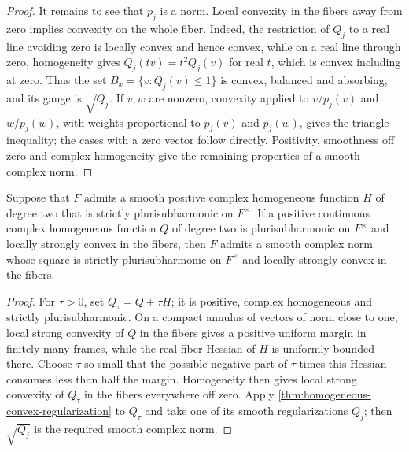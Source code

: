 \begin{proof}
It remains to see that $p_j$ is a norm. Local convexity in the fibers away from zero implies convexity on the whole fiber. Indeed, the restriction of $Q_j$ to a real line avoiding zero is locally convex and hence convex, while on a real line through zero, homogeneity gives $Q_j(tv)=t^2Q_j(v)$ for real $t$, which is convex including at zero. Thus the set $B_x=\{v:Q_j(v)\leq1\}$ is convex, balanced and absorbing, and its gauge is $\sqrt{Q_j}$. If $v,w$ are nonzero, convexity applied to $v/p_j(v)$ and $w/p_j(w)$, with weights proportional to $p_j(v)$ and $p_j(w)$, gives the triangle inequality; the cases with a zero vector follow directly. Positivity, smoothness off zero and complex homogeneity give the remaining properties of a smooth complex norm.
\end{proof}

\begin{proposition}\label{prop:weak-homogeneous-convex-replacement}
Suppose that $F$ admits a smooth positive complex homogeneous function $H$ of degree two that is strictly plurisubharmonic on $F^\times$. If a positive continuous complex homogeneous function $Q$ of degree two is plurisubharmonic on $F^\times$ and locally strongly convex in the fibers, then $F$ admits a smooth complex norm whose square is strictly plurisubharmonic on $F^\times$ and locally strongly convex in the fibers.
\end{proposition}
\begin{proof}
For $\tau>0$, set $Q_\tau=Q+\tau H$; it is positive, complex homogeneous and strictly plurisubharmonic. On a compact annulus of vectors of norm close to one, local strong convexity of $Q$ in the fibers gives a positive uniform margin in finitely many frames, while the real fiber Hessian of $H$ is uniformly bounded there. Choose $\tau$ so small that the possible negative part of $\tau$ times this Hessian consumes less than half the margin. Homogeneity then gives local strong convexity of $Q_\tau$ in the fibers everywhere off zero. Apply \cref{thm:homogeneous-convex-regularization} to $Q_\tau$ and take one of its smooth regularizations $Q_j$; then $\sqrt{Q_j}$ is the required smooth complex norm.
\end{proof}

